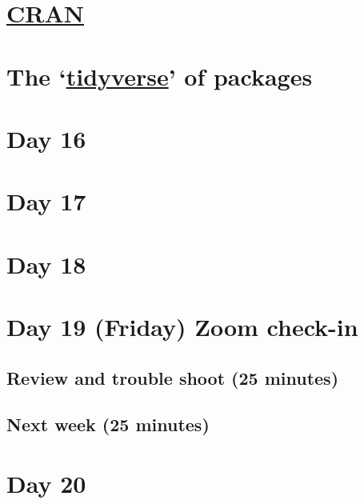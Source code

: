 \documentclass[
]{book}
\begin{document}
\hypertarget{cran}{%
\section{\texorpdfstring{\href{https://cran.r-project.org}{CRAN}}{CRAN}}\label{cran}}

\hypertarget{the-tidyverse-of-packages}{%
\section{\texorpdfstring{The `\href{https://www.tidyverse.org/}{tidyverse}' of packages}{The `tidyverse' of packages}}\label{the-tidyverse-of-packages}}

\hypertarget{day-16}{%
\section{Day 16}\label{day-16}}

\hypertarget{day-17}{%
\section{Day 17}\label{day-17}}

\hypertarget{day-18}{%
\section{Day 18}\label{day-18}}

\hypertarget{day-19-friday-zoom-check-in}{%
\section{Day 19 (Friday) Zoom check-in}\label{day-19-friday-zoom-check-in}}

\hypertarget{review-and-trouble-shoot-25-minutes}{%
\subsection{Review and trouble shoot (25 minutes)}\label{review-and-trouble-shoot-25-minutes}}

\hypertarget{next-week-25-minutes}{%
\subsection{Next week (25 minutes)}\label{next-week-25-minutes}}

\hypertarget{day-20}{%
\section{Day 20}\label{day-20}}
\end{document}
